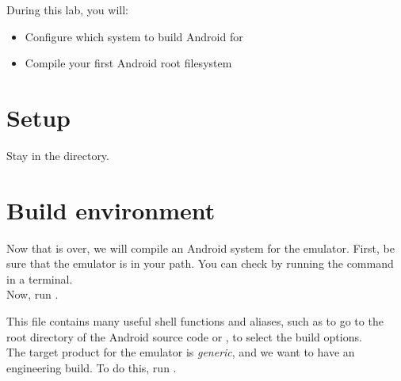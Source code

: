 
During this lab, you will:
\begin{itemize}
  \item Configure which system to build Android for
  \item Compile your first Android root filesystem
\end{itemize}

\section{Setup}

Stay in the  directory.

\section{Build environment}

Now that  is over, we will compile an Android system for the
emulator. First, be sure that the emulator is in your path. You can check
by running the  command in a terminal.\\

Now, run .

This file contains many useful shell functions and aliases, such as  to
go to the root directory of the Android source code or , to select
the build options.\\

The target product for the emulator is {\it generic}, and we want to have an 
engineering build. To do this, run .\\

